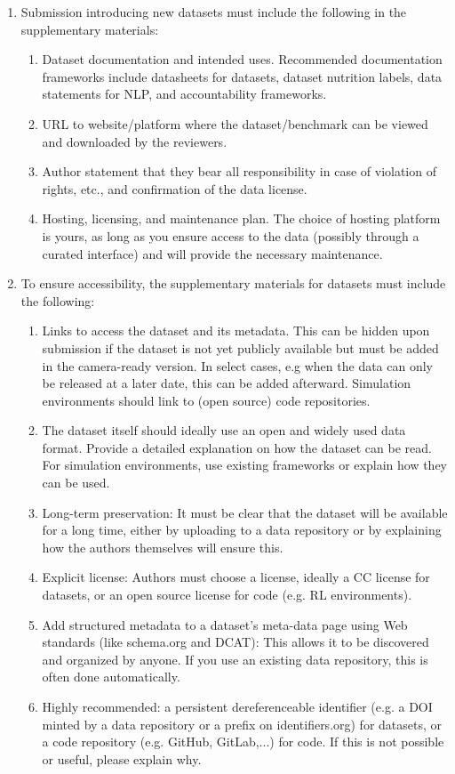 \begin{enumerate}

\item Submission introducing new datasets must include the following in the supplementary materials:
\begin{enumerate}
  \item Dataset documentation and intended uses. Recommended documentation frameworks include datasheets for datasets, dataset nutrition labels, data statements for NLP, and accountability frameworks.
  \item URL to website/platform where the dataset/benchmark can be viewed and downloaded by the reviewers.
  \item Author statement that they bear all responsibility in case of violation of rights, etc., and confirmation of the data license.
  \item Hosting, licensing, and maintenance plan. The choice of hosting platform is yours, as long as you ensure access to the data (possibly through a curated interface) and will provide the necessary maintenance.
\end{enumerate}

\item To ensure accessibility, the supplementary materials for datasets must include the following:
\begin{enumerate}
  \item Links to access the dataset and its metadata. This can be hidden upon submission if the dataset is not yet publicly available but must be added in the camera-ready version. In select cases, e.g when the data can only be released at a later date, this can be added afterward. Simulation environments should link to (open source) code repositories.
  \item The dataset itself should ideally use an open and widely used data format. Provide a detailed explanation on how the dataset can be read. For simulation environments, use existing frameworks or explain how they can be used.
  \item Long-term preservation: It must be clear that the dataset will be available for a long time, either by uploading to a data repository or by explaining how the authors themselves will ensure this.
  \item Explicit license: Authors must choose a license, ideally a CC license for datasets, or an open source license for code (e.g. RL environments).
  \item Add structured metadata to a dataset's meta-data page using Web standards (like schema.org and DCAT): This allows it to be discovered and organized by anyone. If you use an existing data repository, this is often done automatically.
  \item Highly recommended: a persistent dereferenceable identifier (e.g. a DOI minted by a data repository or a prefix on identifiers.org) for datasets, or a code repository (e.g. GitHub, GitLab,...) for code. If this is not possible or useful, please explain why.
\end{enumerate}


\end{enumerate}
